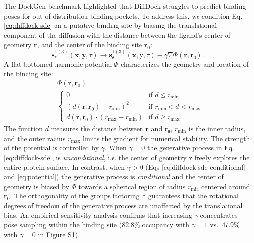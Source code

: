 \documentclass[letterpaper]{article}
\begin{document}
The DockGen benchmark highlighted that DiffDock struggles to predict binding poses for out of distribution binding pockets.\cite{corso2024dockgen} To address this, we condition Eq. \ref{eq:diffdock-sde} on a putative binding site by biasing the translational component of the diffusion with the distance between the ligand's center of geometry $\mathbf{r}$, and the center of the binding site $\mathbf{r}_0$:
\begin{equation}
    \label{eq:diffdock-sde-conditional}
        \mathbf{s}^{\mathbb{T}(3)}_\theta(\mathbf{x}, \mathbf{y}, \tau)\rightarrow \mathbf{s}^{\mathbb{T}(3)}_\theta(\mathbf{x}, \mathbf{y}, \tau) - \gamma \nabla \Phi(\mathbf{r},\mathbf{r}_0).
\end{equation}
A flat-bottomed harmonic potential $\Phi$ characterizes the geometry and location of the binding site:
\begin{equation}
    \label{eq:potential}
    \begin{aligned}
    &\Phi(\mathbf{r}, \mathbf{r}_0)  = \\
    &\begin{cases} 
    0 &\text{if } d \leq r_{\mathrm{min}} \\
    (d(\mathbf{r},\mathbf{r}_0) - r_{\mathrm{min}})^2 &\text{if } r_{\mathrm{min}} < d < r_{\mathrm{max}} \\
    d(\mathbf{r},\mathbf{r}_0)\cdot (r_{\mathrm{max}} - r_{\mathrm{min}}) &\text{if } d \geq r_{\mathrm{max}}.
    \end{cases}
    \end{aligned}
\end{equation}
The function $d$ measures the distance between $\mathbf{r}$ and $\mathbf{r}_0$, $r_{\mathrm{min}}$ is the inner radius, and the outer radius $r_{\mathrm{max}}$ limits the gradient for numerical stability. The strength of the potential is controlled by $\gamma$. When $\gamma=0$ the generative process in Eq. \ref{eq:diffdock-sde}, is {\it unconditional}, i.e. the center of geometry $\mathbf{r}$ freely explores the entire protein surface. In contrast, when $\gamma > 0$ (Eqs \ref{eq:diffdock-sde-conditional} and \ref{eq:potential}) the generative process is {\it conditional} and the center of geometry is biased by $\Phi$ towards a spherical region of radius $r_\mathrm{min}$ centered around $\mathbf{r}_0$. The orthogonality of the groups factoring $\mathbb{P}$ guarantees that the rotational degrees of freedom of the generative process are unaffected by the translational bias. An empirical sensitivity analysis confirms that increasing $\gamma$ concentrates pose sampling within the binding site (82.8\% occupancy with $\gamma=1$ vs.\ 47.9\% with $\gamma=0$ in Figure S1).
\end{document}
